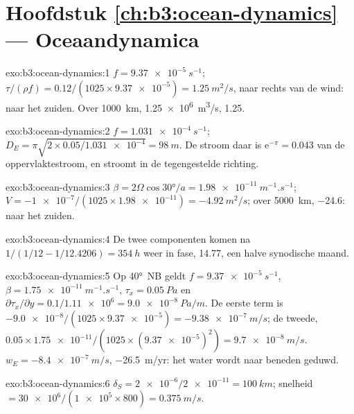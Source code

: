 \section*{Hoofdstuk \ref{ch:b3:ocean-dynamics} --- Oceaandynamica}

\begin{solution}{exo:b3:ocean-dynamics:1}
$f = \qty{9.37e-5}{s^{-1}}$; $\tau/(\rho f) = 0.12/(1025\times\num{9.37e-5})
= \qty{1.25}{m^2/s}$, naar rechts van de wind: naar het zuiden. Over
\qty{1000}{km}, \qty{1.25e6}{m^3/s}, \qty{1.25}{\sverdrup}.
\end{solution}

\begin{solution}{exo:b3:ocean-dynamics:2}
$f = \qty{1.031e-4}{s^{-1}}$; $D_E = \pi\sqrt{2\times0.05/\num{1.031e-4}}
= \qty{98}{m}$. De stroom daar is $\mathrm e^{-\pi} = \num{0.043}$ van de
oppervlaktestroom, en stroomt in de tegengestelde richting.
\end{solution}

\begin{solution}{exo:b3:ocean-dynamics:3}
$\beta = 2\Omega\cos\ang{30}/a = \qty{1.98e-11}{m^{-1}.s^{-1}}$; $V =
\num{-1e-7}/(1025\times\num{1.98e-11}) = \qty{-4.92}{m^2/s}$; over
\qty{5000}{km}, \qty{-24.6}{\sverdrup}: naar het zuiden.
\end{solution}

\begin{solution}{exo:b3:ocean-dynamics:4}
De twee componenten komen na $1/(1/12 - 1/12.4206) =
\qty{354}{h}$ weer in fase, \num{14.77}, een halve synodische maand.
\end{solution}

\begin{solution}{exo:b3:ocean-dynamics:5}
Op \ang{40}~NB geldt $f = \qty{9.37e-5}{s^{-1}}$, $\beta =
\qty{1.75e-11}{m^{-1}.s^{-1}}$, $\tau_x = \qty{0.05}{Pa}$ en
$\partial\tau_x/\partial y = 0.1/\num{1.11e6} = \qty{9.0e-8}{Pa/m}$. De
eerste term is $-\num{9.0e-8}/(1025\times\num{9.37e-5}) =
\qty{-9.38e-7}{m/s}$; de tweede, $0.05\times\num{1.75e-11}/(1025\times
(\num{9.37e-5})^2) = \qty{+9.7e-8}{m/s}$. $w_E = \qty{-8.4e-7}{m/s}$,
\qty{-26.5}{m/yr}: het water wordt naar beneden geduwd.
\end{solution}

\begin{solution}{exo:b3:ocean-dynamics:6}
$\delta_S = \num{2e-6}/\num{2e-11} = \qty{100}{km}$; snelheid $=
\num{30e6}/(\num{1e5}\times800) = \qty{0.375}{m/s}$.
\end{solution}


